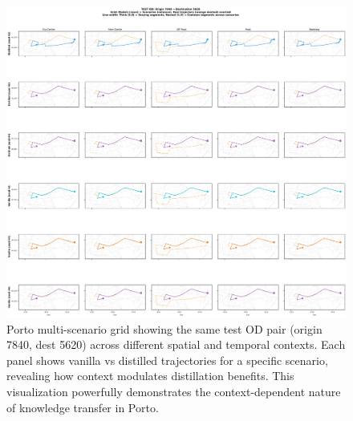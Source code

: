 \begin{figure}[H]
    \centering
    \includegraphics[width=0.95\linewidth]{assets/plots/eval/porto/scenario_cross_model/test/multi_scenario_grid/test_origin7840_dest5620_grid.pdf}
    \caption{Porto multi-scenario grid showing the same test OD pair (origin 7840, dest 5620) across different spatial and temporal contexts. Each panel shows vanilla vs distilled trajectories for a specific scenario, revealing how context modulates distillation benefits. This visualization powerfully demonstrates the context-dependent nature of knowledge transfer in Porto.}
    \label{fig:appendix-porto-multiscenario-grid}
\end{figure}
